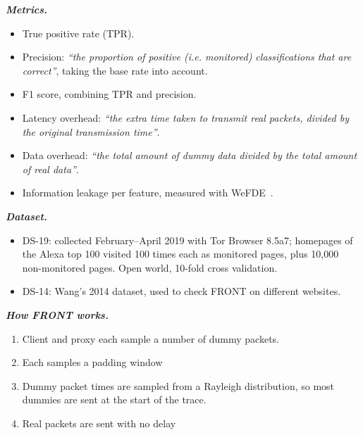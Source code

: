 \textbf{\textit{Metrics.}}~\cite[p.~720]{gong2020front}
\begin{itemize}
    \item True positive rate (TPR).
    \item Precision: \textit{``the proportion of positive (i.e. monitored) classifications that are correct''}, taking the base rate into account.
    \item F1 score, combining TPR and precision.
    \item Latency overhead: \textit{``the extra time taken to transmit real packets, divided by the original transmission time''}.
    \item Data overhead: \textit{``the total amount of dummy data divided by the total amount of real data''}.
    \item Information leakage per feature, measured with WeFDE~\cite[p.~723]{gong2020front}.
\end{itemize}

\textbf{\textit{Dataset.}}~\cite[pp.~722--723]{gong2020front}
\begin{itemize}
    \item DS-19: collected February--April 2019 with Tor Browser 8.5a7; homepages of the Alexa top 100 visited 100 times each as monitored pages, plus 10{,}000 non-monitored pages. Open world, 10-fold cross validation.
    \item DS-14: Wang's 2014 dataset, used to check FRONT on different websites.
\end{itemize}

\textbf{\textit{How FRONT works.}}~\cite[pp.~721--722]{gong2020front}
\begin{enumerate}
    \item Client and proxy each sample a number of dummy packets.
    \item Each samples a padding window
    \item Dummy packet times are sampled from a Rayleigh distribution, so most dummies are sent at the start of the trace.
    \item Real packets are sent with no delay
\end{enumerate}


